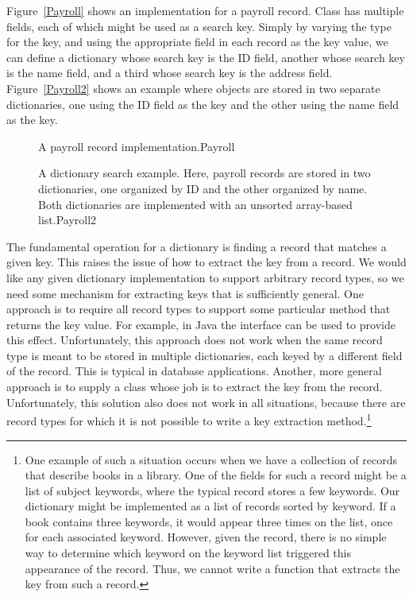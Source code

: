 Figure~\ref{Payroll} shows an implementation for a payroll record.
Class  has multiple fields, each of which might be
used as a search key.
Simply by varying the type for the key, and using the appropriate
field in each record as the key value,
we can define a dictionary whose search key is the ID field,
another whose search key is the name field, and a third whose search
key is the address field.
Figure~\ref{Payroll2} shows an example where  objects
are stored in two separate dictionaries, one using the
ID field as the key and the other using the name field as the key.

\begin{figure}
\vspace{-\medskipamount}
{A payroll record implementation.}{Payroll}
\end{figure}

\begin{figure}
{A dictionary search example.
Here, payroll records are stored in two dictionaries, one organized by
ID and the other organized by name.
Both dictionaries are implemented with an unsorted
array-based list.}{Payroll2}
\medskip
\end{figure}

The fundamental operation for a dictionary is finding a record that
matches a given key.
This raises the issue of how to extract the key from a record.
We would like any given dictionary implementation to support arbitrary
record types, so we need some mechanism for extracting keys that is
sufficiently general.
One approach is to require all record types to support some particular
method that returns the key value.
For example, in Java the  interface can be used to
provide this effect.
Unfortunately, this approach does not work when the same record type is
meant to be stored in multiple dictionaries, each keyed by a different
field of the record.
This is typical in database applications.
Another, more general approach is to supply a class whose job is to
extract the key from the record.
Unfortunately, this solution also does not work in all situations,
because there are record types for which it is not possible to write
a key extraction method.\footnote{One example of such a situation occurs
when we have a collection of records that describe books in a library.
One of the fields for such a record might be a list of subject
keywords, where the typical record stores a few keywords.
Our dictionary might be implemented as a list of records sorted by
keyword.
If a book contains three keywords, it would appear three times on the
list, once for each associated keyword.
However, given the record, there is no simple way to determine which
keyword on the keyword list triggered this appearance of the record.
Thus, we cannot write a function that extracts the key from such a
record.}

